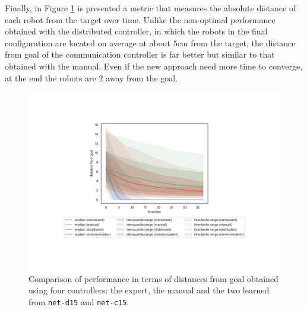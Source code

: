 Finally, in Figure \ref{fig:net-c15distance} is presented a metric that measures the 
absolute distance of each robot from the target over time.
Unlike the non-optimal performance obtained with the distributed controller, in 
which the robots in the final configuration are located on average at about 
$5$\gls{cm} from the target, the distance from goal of the communication 
controller is far better but similar to that obtained with the manual. Even if the 
new approach need more time to converge, at the end the robots are $2$ away 
from the goal.
\begin{figure}[H]
	\centering
	\includegraphics[width=.65\textwidth]{contents/images/net-c15/distances-from-goal-compressed-communication}%
	\caption[Evaluation of \texttt{net-c15} distances from goal.]{Comparison of 
		performance in terms of distances from goal obtained using four controllers: 
		the expert, the manual and the two learned from \texttt{net-d15} and 
		\texttt{net-c15}.}
	\label{fig:net-c15distance}
\end{figure}

